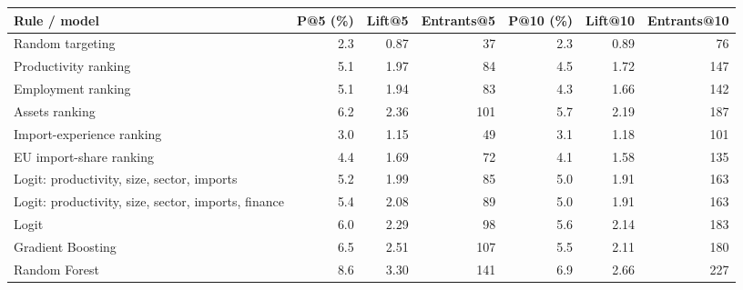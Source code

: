 \begin{table}[!htbp]
 \label{tab:policy_baselines_v2}
\centering
\footnotesize
\setlength{\tabcolsep}{4pt}
\begin{adjustbox}{max width=\textwidth}
\begin{tabular}{lrrrrrr}
\hline
Rule / model & P@5 (\%) & Lift@5 & Entrants@5 & P@10 (\%) & Lift@10 & Entrants@10 \\
\hline
Random targeting & 2.3 & 0.87 & 37 & 2.3 & 0.89 & 76 \\
Productivity ranking & 5.1 & 1.97 & 84 & 4.5 & 1.72 & 147 \\
Employment ranking & 5.1 & 1.94 & 83 & 4.3 & 1.66 & 142 \\
Assets ranking & 6.2 & 2.36 & 101 & 5.7 & 2.19 & 187 \\
Import-experience ranking & 3.0 & 1.15 & 49 & 3.1 & 1.18 & 101 \\
EU import-share ranking & 4.4 & 1.69 & 72 & 4.1 & 1.58 & 135 \\
Logit: productivity, size, sector, imports & 5.2 & 1.99 & 85 & 5.0 & 1.91 & 163 \\
Logit: productivity, size, sector, imports, finance & 5.4 & 2.08 & 89 & 5.0 & 1.91 & 163 \\
Logit & 6.0 & 2.29 & 98 & 5.6 & 2.14 & 183 \\
Gradient Boosting & 6.5 & 2.51 & 107 & 5.5 & 2.11 & 180 \\
Random Forest & 8.6 & 3.30 & 141 & 6.9 & 2.66 & 227 \\
\hline
\end{tabular}
\end{adjustbox}
\end{table}